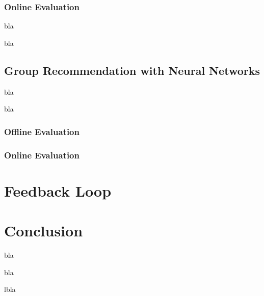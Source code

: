 \subsubsection{Online Evaluation}

bla

bla

\subsection{Group Recommendation with Neural Networks}

bla

bla

\subsubsection{Offline Evaluation}

\subsubsection{Online Evaluation}

\section{Feedback Loop}


\section{Conclusion}

bla

bla 

lbla
